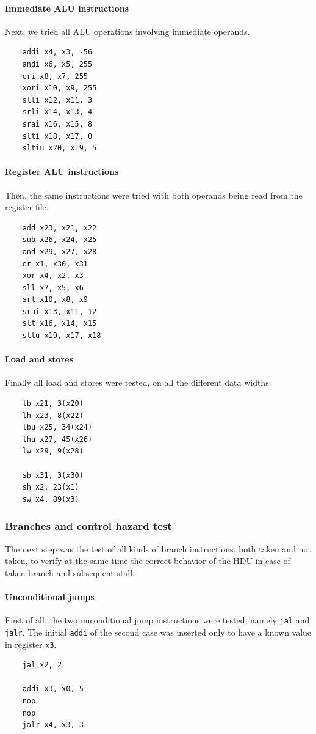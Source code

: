 \documentclass[a4paper]{article}
\begin{document}
\paragraph{Immediate ALU instructions}
Next, we tried all ALU operations involving immediate operands.

\begin{verbatim}
    addi x4, x3, -56
    andi x6, x5, 255
    ori x8, x7, 255
    xori x10, x9, 255
    slli x12, x11, 3 
    srli x14, x13, 4
    srai x16, x15, 8
    slti x18, x17, 0
    sltiu x20, x19, 5
\end{verbatim}

\paragraph{Register ALU instructions}
Then, the same instructions were tried with both operands being read from the register file.

\begin{verbatim}
    add x23, x21, x22
    sub x26, x24, x25
    and x29, x27, x28
    or x1, x30, x31
    xor x4, x2, x3
    sll x7, x5, x6
    srl x10, x8, x9
    srai x13, x11, 12
    slt x16, x14, x15
    sltu x19, x17, x18
\end{verbatim}

\paragraph{Load and stores}
Finally all load and stores were tested, on all the different data widths.

\begin{verbatim}
    lb x21, 3(x20)
    lh x23, 8(x22)
    lbu x25, 34(x24)
    lhu x27, 45(x26)
    lw x29, 9(x28)

    sb x31, 3(x30)
    sh x2, 23(x1)
    sw x4, 89(x3)
\end{verbatim}

\subsubsection{Branches and control hazard test}
The next step was the test of all kinds of branch instructions, both taken and not taken, to verify at the same time the correct behavior of the HDU in case of taken branch and subsequent stall.

\paragraph{Unconditional jumps}
First of all, the two unconditional jump instructions were tested, namely \texttt{jal} and \texttt{jalr}. The initial \texttt{addi} of the second case was inserted only to have a known value in register \texttt{x3}.
\begin{verbatim}
    jal x2, 2

    addi x3, x0, 5
    nop
    nop
    jalr x4, x3, 3
\end{verbatim}
\end{document}
